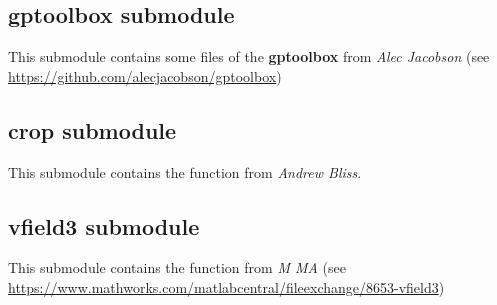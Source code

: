

\subsection{gptoolbox submodule}
This submodule contains some files of the \textbf{gptoolbox} from \textit{Alec Jacobson}
(see \url{https://github.com/alecjacobson/gptoolbox})

\subsection{crop submodule}
This submodule contains the function  from \textit{Andrew Bliss}.

\subsection{vfield3 submodule}
This submodule contains the function  from \textit{M MA} (see 
\url{https://www.mathworks.com/matlabcentral/fileexchange/8653-vfield3})
